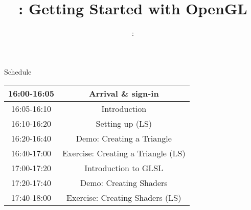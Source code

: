 \usepackage{../../beamerthemeFalmouthGamesAcademy}
\usepackage{multimedia}
\graphicspath{ {../../} }




\usepackage[normalem]{ulem}
\usepackage{wasysym}

\usepackage{pdfpages}

\usetikzlibrary{arrows,automata}




\title{\sessionnumber: Getting Started with OpenGL}
\subtitle{\modulecode: \moduletitle}

\frame{\titlepage} 



\begin{frame}{Schedule}
	\begin{center}
		\begin{tabular}{|c c|}
			\hline
			16:00-16:05 & Arrival \& sign-in \\
			\hline
			16:05-16:10 & Introduction \\
			\hline
			16:10-16:20 & Setting up (LS) \\
			\hline
			16:20-16:40 & Demo: Creating a Triangle \\
			16:40-17:00 & Exercise: Creating a Triangle (LS) \\
			\hline
			17:00-17:20 & Introduction to GLSL \\
			\hline
			17:20-17:40 & Demo: Creating Shaders \\
			17:40-18:00 & Exercise: Creating Shaders (LS) \\
			\hline
		\end{tabular}
	\end{center}
\end{frame}






